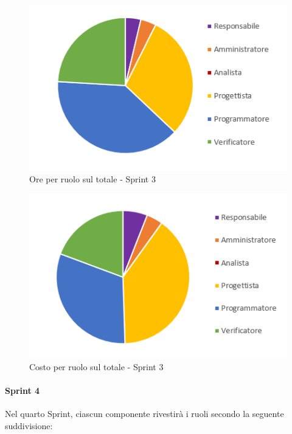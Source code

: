 \begin{figure}[H]
  \centering
  \includegraphics[scale=0.8]{immagini/3Sprint_oreRuolo.png}
  \caption{Ore per ruolo sul totale - Sprint 3}
\end{figure}

\begin{figure}[H]
  \centering
  \includegraphics[scale=0.8]{immagini/3Sprint_costoRuolo.png}
  \caption{Costo per ruolo sul totale - Sprint 3}
\end{figure}
\pagebreak

\paragraph{Sprint 4} \label{paragraph:preventivo_sprint4}
Nel quarto Sprint\glo{}, ciascun componente rivestirà i ruoli secondo la seguente suddivisione:

